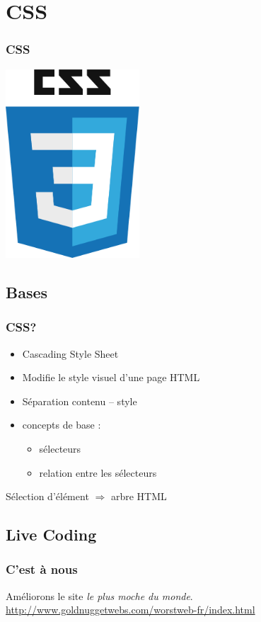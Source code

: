 \documentclass{beamer}
\begin{document}
	\section{CSS}
	\begin{frame}
		\frametitle{CSS}
		\centering \includegraphics[width=5cm]{images/css3.png} 
    \end{frame}
	
	\subsection{Bases}
    \begin{frame}
    	\frametitle{CSS?}
		\begin{itemize}
			\item Cascading Style Sheet
			\item Modifie le style visuel d'une page HTML
			\item Séparation contenu -- style
			\item concepts de base : 
				\begin{itemize}
					\item sélecteurs
					\item relation entre les sélecteurs
				\end{itemize}
		\end{itemize}

		\vspace{1cm}
		\centering Sélection d'élément $\Rightarrow$ arbre HTML		
		
    \end{frame}
	
	\subsection{Live Coding}
	    \begin{frame}
    	\frametitle{C'est à nous}
		\centering Améliorons le site \emph{le plus moche du monde}. \url{http://www.goldnuggetwebs.com/worstweb-fr/index.html}
    \end{frame}
	
\end{document}
